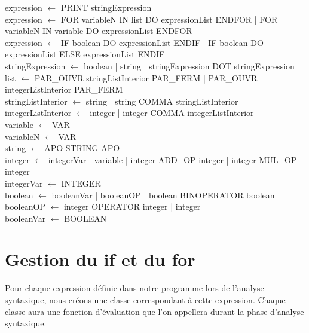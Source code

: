 ﻿\documentclass{report}
\begin{document}
expression $\leftarrow$ PRINT stringExpression\\

expression $\leftarrow$ FOR variableN IN list DO expressionList ENDFOR | FOR variableN IN variable DO expressionList ENDFOR\\

expression $\leftarrow$ IF boolean DO expressionList ENDIF | IF boolean DO expressionList ELSE expressionList ENDIF\\

stringExpression $\leftarrow$ boolean | string | stringExpression DOT stringExpression\\

list $\leftarrow$ PAR\_OUVR stringListInterior PAR\_FERM | PAR\_OUVR integerListInterior PAR\_FERM\\

stringListInterior $\leftarrow$ string | string COMMA stringListInterior\\

integerListInterior $\leftarrow$ integer | integer COMMA integerListInterior\\

variable $\leftarrow$ VAR\\

variableN $\leftarrow$ VAR\\

string $\leftarrow$ APO STRING APO\\

integer $\leftarrow$ integerVar | variable | integer ADD\_OP integer | integer MUL\_OP integer\\

integerVar $\leftarrow$ INTEGER\\

boolean $\leftarrow$ booleanVar | booleanOP | boolean BINOPERATOR boolean\\

booleanOP $\leftarrow$ integer OPERATOR integer | integer\\

booleanVar $\leftarrow$ BOOLEAN\\


\section*{ Gestion du if et du for}

Pour chaque expression définie dans notre programme lors de l'analyse syntaxique, nous créons une classe correspondant à cette expression. Chaque classe aura une fonction d'évaluation que l'on appellera durant la phase d'analyse syntaxique.\\
\end{document}
